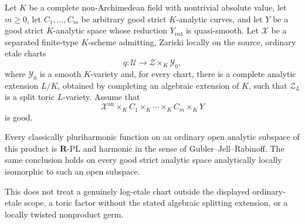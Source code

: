 
\begin{corollary}
\label{cor:p061-etale-toric-arbitrary-curve-factor-products}
Let $K$ be a complete non-Archimedean field with nontrivial absolute
value, let $m\geq0$, let $C_1,\ldots,C_m$ be arbitrary good strict
$K$-analytic curves, and let $Y$ be a good strict $K$-analytic space whose
reduction $Y_{\mathrm{red}}$ is quasi-smooth.  Let $\mathcal X$ be a
separated finite-type $K$-scheme admitting, Zariski locally on the source,
ordinary etale charts
\[
 q:\mathcal U\longrightarrow\mathcal Z\times_K\mathcal Y_0,
\]
where $\mathcal Y_0$ is a smooth $K$-variety and, for every chart, there is
a complete analytic extension $L/K$, obtained by completing an algebraic
extension of $K$, such that $\mathcal Z_L$ is a split toric $L$-variety.
Assume that
\[
 \mathcal X^{\mathrm{an}}\times_K C_1\times_K\cdots
       \times_K C_m\times_KY
\]
is good.

Every classically pluriharmonic function on an ordinary open analytic
subspace of this product is $\mathbf R$-PL and harmonic in the sense of
Gubler--Jell--Rabinoff.  The same conclusion holds on every good strict
analytic space analytically locally isomorphic to such an open subspace.

This does not treat a genuinely log-etale chart outside the displayed
ordinary-etale scope, a toric factor without the stated algebraic splitting
extension, or a locally twisted nonproduct germ.
\end{corollary}

